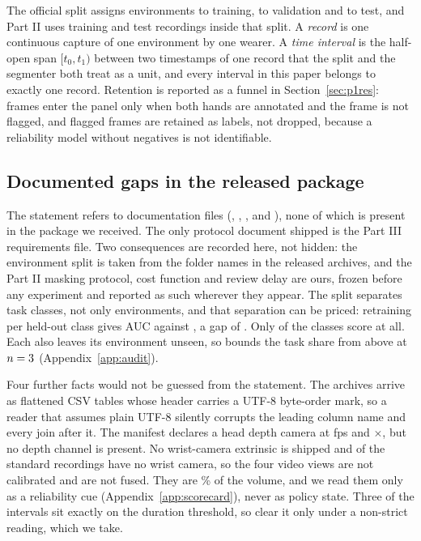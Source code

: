\documentclass{swmcmthesis}
\begin{document}
The official split assigns \slotSplitTrain{} environments to training,
\slotSplitVal{} to validation and \slotSplitTest{} to test, and Part II uses
\slotPTwoTrainRecords{} training and \slotPTwoTestRecords{} test recordings inside
that split. A \emph{record} is one continuous capture of one environment by one
wearer. A \emph{time interval} is the half-open span $[t_0,t_1)$ between two
timestamps of one record that the split and the segmenter both treat as a unit, and
every interval in this paper belongs to exactly one record. Retention is reported as a
funnel in Section~\ref{sec:p1res}: frames
enter the panel only when both hands are annotated and the frame is not flagged,
and flagged frames are retained as labels, not dropped, because a
reliability model without negatives is not identifiable.

\subsection{Documented gaps in the released package}

The statement refers to \slotMissingDocs{} documentation files (, , ,  and ), none of which is present in the
package we received. The only protocol document shipped is the Part III requirements file.
Two consequences are recorded here, not hidden: the environment split is taken from
the folder names in the released archives, and the Part II masking protocol, cost function
and review delay are ours, frozen before any experiment and reported as such wherever they
appear. The split separates task classes, not only environments, and that separation can be
priced: retraining per held-out class gives AUC \slotPLotoMean{} against \slotPLotoRef{}, a
gap of \slotPLotoGap{}. Only \slotPLotoNEval{} of the \slotPLotoNClass{} classes score at
all. Each also leaves its environment unseen, so \slotPLotoFrac{} bounds the task share from
above at $n=3{}$ (Appendix~\ref{app:audit}).

Four further facts would not be guessed from the statement. The archives arrive as flattened
CSV tables whose header carries a UTF-8 byte-order mark, so a reader that assumes plain UTF-8
silently corrupts the leading column name and every join after it. The manifest declares a head
depth camera at \slotDepthFPS{} fps and \slotDepthW{}$\times$\slotDepthH{}, but no depth
channel is present. No wrist-camera extrinsic is shipped and \slotStdNoWrist{} of the
\slotStdRecords{} standard recordings have no wrist camera, so the four video views are not
calibrated and are not fused. They are \slotVideoShare{}\% of the volume, and we read them
only as a reliability cue (Appendix~\ref{app:scorecard}), never as policy state. Three of the \slotNIntervals{} intervals sit exactly on the
duration threshold, so \slotNEligible{} clear it only under a non-strict reading, which we take.
\end{document}
